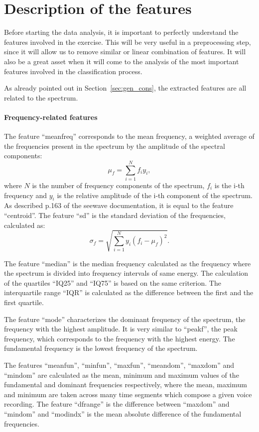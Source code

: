\section{Description of the features}
\label{sec:feat_desc}
Before starting the data analysis, it is important to perfectly understand the features involved in the exercise. This will be very useful in a preprocessing step, since it will allow us to remove similar or linear combination of features. It will also be a great asset when it will come to the analysis of the most important features involved in the classification process.

As already pointed out in Section~\ref{sec:gen_cons}, the extracted features are all related to the spectrum. 
\paragraph{Frequency-related features}
The feature ``meanfreq'' corresponds to the mean frequency, \ie{} a weighted average of the frequencies present in the spectrum by the amplitude of the spectral components:
\begin{equation}
\mu_f = \sum\limits_{i=1}^{N} f_i y_i ,
\end{equation} 
where $N$ is the number of frequency components of the spectrum, $f_i$ is the i-th frequency and $y_i$ is the relative amplitude of the i-th component of the spectrum. 
As described p.\num{163} of the seewave documentation, it is equal to the feature ``centroid''.
The feature ``sd'' is the standard deviation of the frequencies, calculated as:
\begin{equation}
\sigma_f = \sqrt{\sum\limits_{i=1}^{N}y_i \left(f_i-\mu_f\right)^2}.
\end{equation}

The feature ``median'' is the median frequency calculated as the frequency where the spectrum is divided into frequency intervals of same energy. The calculation of the quartiles ``IQ25'' and ``IQ75'' is based on the same criterion. The interquartile range ``IQR'' is calculated as the difference between the first and the first quartile.

The feature ``mode'' characterizes the dominant frequency of the spectrum, \ie{} the frequency with the highest amplitude. It is very similar to ``peakf'', the peak frequency, which corresponds to the frequency with the highest energy. The fundamental frequency is the lowest frequency of the spectrum.

The features ``meanfun'', ``minfun'', ``maxfun'', ``meandom'', ``maxdom'' and ``mindom'' are calculated as the mean, minimum and maximum values of the fundamental and dominant frequencies respectively, where the mean, maximum and minimum are taken across many time segments which compose a given voice recording. The feature ``dfrange'' is the difference between ``maxdom'' and ``mindom'' and ``modindx'' is the mean absolute difference of the fundamental frequencies.

